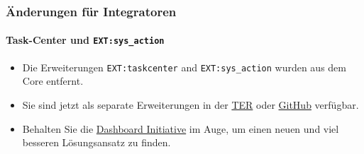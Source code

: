
\begin{frame}[fragile]
	\frametitle{Änderungen für Integratoren}
	\framesubtitle{Task-Center und \texttt{EXT:sys\_action}}

	\begin{itemize}

		\item Die Erweiterungen \texttt{EXT:taskcenter} and \texttt{EXT:sys\_action}
			wurden aus dem Core entfernt.

		\item Sie sind jetzt als separate Erweiterungen in der
			\href{https://extensions.typo3.org/}{TER}
			oder
			\href{https://github.com/FriendsOfTYPO3}{GitHub} verfügbar.

		\item Behalten Sie die 
			\href{https://typo3.org/community/teams/typo3-development/initiatives/typo3-dashboard-initiative/}{Dashboard Initiative}
			 im Auge, um einen neuen und viel besseren Lösungsansatz zu finden.

	\end{itemize}

\end{frame}


